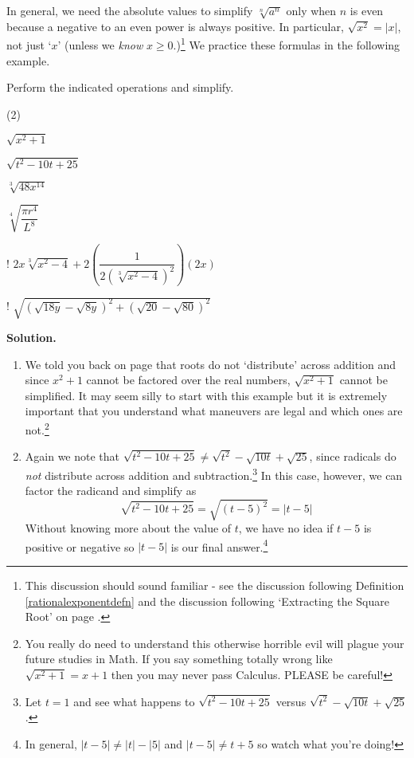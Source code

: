 In general, we need the absolute values to simplify $\sqrt[n]{a^{n}}$ only when $n$ is even because a negative to an even power is always positive.  In particular, $\sqrt{x^2} = |x|$, not just `$x$' (unless we \textit{know} $x \geq 0$.)\footnote{This discussion should sound familiar - see the discussion following Definition \ref{rationalexponentdefn} and the discussion following `Extracting the Square Root' on page \pageref{extractingthesquareroot}.}  We practice these formulas in the following example.

\begin{ex}\label{simplifyradexpressions}  Perform the indicated operations and simplify.

\begin{tasks}(2)

\task  $\sqrt{x^{2} + 1}$

\task  $\sqrt{t^2-10t+25}$

\task  $\sqrt[3]{48x^{14}}$

\task  $\sqrt[4]{\dfrac{\pi r^{4}}{L^{8}}}$

\task! $2x \sqrt[3]{x^2-4} + 2\left(\dfrac{1}{2(\sqrt[3]{x^2-4})^2}\right)  (2x)$ 

\task!  $\sqrt{(\sqrt{18y} - \sqrt{8y})^2 + (\sqrt{20} - \sqrt{80})^2}$ 

\end{tasks}

{\bf Solution.}

\begin{enumerate}

\item We told you back on page \pageref{donotdistributeexponents} that roots do not `distribute' across addition and since $x^{2} + 1$ cannot be factored over the real numbers, $\sqrt{x^{2} + 1}$ cannot be simplified.  It may seem silly to start with this example but it is extremely important that you understand what maneuvers are legal and which ones are not.\footnote{You really do need to understand this otherwise horrible evil will plague your future studies in Math.  If you say something totally wrong like $\sqrt{x^{2} + 1} = x + 1$ then you may never pass Calculus.  PLEASE be careful!}

\item Again we note that $\sqrt{t^2-10t+25}  \neq \sqrt{t^2} - \sqrt{10t} + \sqrt{25}$, since radicals do \textit{not} distribute across addition and subtraction.\footnote{Let $t = 1$ and see what happens to $\sqrt{t^2-10t+25}$  versus $\sqrt{t^2} - \sqrt{10t} + \sqrt{25}$.}  In this case, however, we can factor the radicand and simplify as \[ \sqrt{t^2 - 10t + 25} = \sqrt{(t-5)^2} = |t-5| \]
Without knowing more about the value of $t$, we have no idea if $t-5$ is positive or negative so $|t-5|$ is our final answer.\footnote{In general,  $|t-5| \neq |t| - |5|$ and  $|t-5| \neq t + 5$ so watch what you're doing!}


\end{enumerate}
\end{ex}
